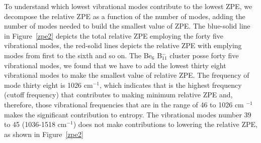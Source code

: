 \documentclass[prb,aps,preprint,showkeys,showpacs]{revtex4}
\begin{document}
To understand which lowest vibrational modes contribute to the lowest ZPE, we decompose the relative ZPE as a function of the number of modes, adding the number of modes needed to build the smallest value of ZPE. The blue-solid line in Figure~\ref{zpe2} depicts the total relative ZPE employing the forty five vibrational modes, the red-solid lines depicts the relative ZPE with emplying modes from first to the sixth and so on. The Be$_6$ B$_{11}^{-}$ cluster posse forty five vibrational modes, we found that we have to add the lowest thirty eight vibrational modes to make the smallest value of relative ZPE. The frequency of mode thirty eight is  1026  cm$^{-1}$, which indicates that is the highest frequency (cutoff frequency)  that contributes to making minimum relative ZPE and, therefore, those vibrational frequencies that are in the range of 46 to 1026 cm $^{-1}$  makes the significant contribution to entropy. 
The vibrational modes number 39 to 45 (1036-1518  cm$^{-1}$) does not  make contributions to lowering the relative ZPE, as shown in Figure~\ref{zpe2}
\end{document}

